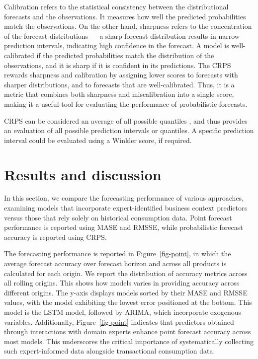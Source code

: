 \documentclass[
  authoryear,
  preprint,
  3p]{elsarticle}
\begin{document}
Calibration refers to the statistical consistency between the
distributional forecasts and the observations. It measures how well the
predicted probabilities match the observations. On the other hand,
sharpness refers to the concentration of the forecast distributions ---
a sharp forecast distribution results in narrow prediction intervals,
indicating high confidence in the forecast. A model is well-calibrated
if the predicted probabilities match the distribution of the
observations, and it is sharp if it is confident in its predictions. The
CRPS rewards sharpness and calibration by assigning lower scores to
forecasts with sharper distributions, and to forecasts that are
well-calibrated. Thus, it is a metric that combines both sharpness and
miscalibration into a single score, making it a useful tool for
evaluating the performance of probabilistic forecasts.

CRPS can be considered an average of all possible quantiles
\citep[Section 5.9]{hyndman2021forecasting}, and thus provides an
evaluation of all possible prediction intervals or quantiles. A specific
prediction interval could be evaluated using a Winkler score, if
required.

\section{Results and discussion}\label{sec-results}

In this section, we compare the forecasting performance of various
approaches, examining models that incorporate expert-identified business
context predictors versus those that rely solely on historical
consumption data. Point forecast performance is reported using MASE and
RMSSE, while probabilistic forecast accuracy is reported using CRPS.

The forecasting performance is reported in Figure~\ref{fig-point}, in
which the average forecast accuracy over forecast horizon and across all
products is calculated for each origin. We report the distribution of
accuracy metrics across all rolling origins. This shows how models
varies in providing accuracy across different origins. The y-axis
displays models sorted by their MASE and RMSSE values, with the model
exhibiting the lowest error positioned at the bottom. This model is the
LSTM model, followed by ARIMA, which incorporate exogenous variables.
Additionally, Figure~\ref{fig-point} indicates that predictors obtained
through interactions with domain experts enhance point forecast accuracy
across most models. This underscores the critical importance of
systematically collecting such expert-informed data alongside
transactional consumption data.
\end{document}
